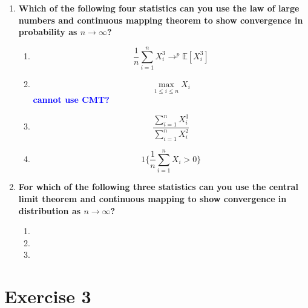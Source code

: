 \documentclass[]{article}
\newcommand{\sumin}{\sum\limits_{i=1}^n} %
\newcommand{\E}{\mathbb{E}}
\newcommand{\fix} [1] {\textbf{\textcolor{blue}{#1}}} %
\begin{document}
\begin{enumerate}[label = (\roman*)]

\item \textbf{Which of the following four statistics can you use the law of large numbers and continuous mapping theorem to show convergence in probability as $n \rightarrow \infty$?}
\begin{enumerate}[label = (\alph*)]

\item  \[\frac{1}{n}\sumin X_i^3 \rightarrow^p \E[X_i^3]\]

\item \[\max_{1\le i \le n} X_i\] \fix{cannot use CMT?}

\item \[ \frac{\sumin X_i^3}{\sumin X_i^2}\]

\item \[ 1 \bigg\{\frac{1}{n}\sumin X_i > 0\bigg\}\]

\end{enumerate}

\item \textbf{For which of the following three statistics can you use the central limit theorem and continuous mapping to show convergence in distribution as $n \rightarrow \infty$?}

\begin{enumerate}[label = (\alph*)]
\item 

\item

\item 

\end{enumerate}


\end{enumerate}

\section*{Exercise 3}
\end{document}
